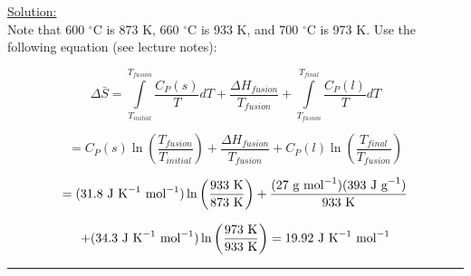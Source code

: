 \noindent
\underline{Solution:}\\

Note that 600 $^\circ$C is 873 K, 660 $^\circ$C is 933 K, and 700 $^\circ$C is 973 K. Use the following equation (see lecture notes):

$$\Delta\bar{S} = \int\limits_{T_{initial}}^{T_{fusion}}\frac{C_P(s)}{T}dT + \frac{\Delta H_{fusion}}{T_{fusion}} + \int\limits_{T_{fusion}}^{T_{final}}\frac{C_P(l)}{T}dT$$

$$= C_P(s)\ln\left(\frac{T_{fusion}}{T_{initial}}\right) + \frac{\Delta H_{fusion}}{T_{fusion}} + C_P(l)\ln\left(\frac{T_{final}}{T_{fusion}}\right)$$

$$= (31.8\textnormal{ J K}^{-1}\textnormal{ mol}^{-1})\ln\left(\frac{933\textnormal{ K}}{873\textnormal{ K}}\right) + \frac{(27\textnormal{ g mol}^{-1})(393\textnormal{ J g}^{-1})}{933\textnormal{ K}}$$

$$ + (34.3\textnormal{ J K}^{-1}\textnormal{ mol}^{-1})\ln\left(\frac{973\textnormal{ K}}{933\textnormal{ K}}\right) = 19.92\textnormal{ J K}^{-1}\textnormal{ mol}^{-1}$$

\hrule\vspace{0.5cm}
